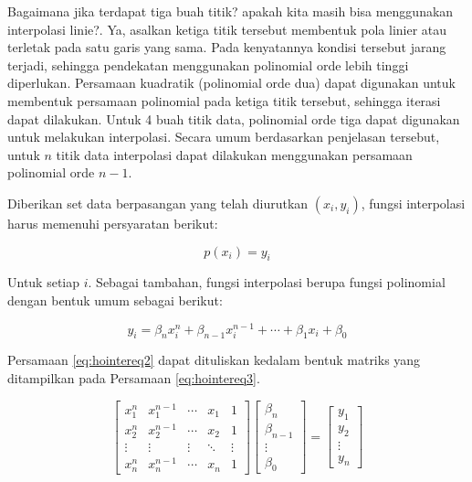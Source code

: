 \documentclass[]{book}
\theoremstyle{definition}
\theoremstyle{definition}
\theoremstyle{definition}
\theoremstyle{remark}
\begin{document}
Bagaimana jika terdapat tiga buah titik? apakah kita masih bisa menggunakan interpolasi linie?. Ya, asalkan ketiga titik tersebut membentuk pola linier atau terletak pada satu garis yang sama. Pada kenyatannya kondisi tersebut jarang terjadi, sehingga pendekatan menggunakan polinomial orde lebih tinggi diperlukan. Persamaan kuadratik (polinomial orde dua) dapat digunakan untuk membentuk persamaan polinomial pada ketiga titik tersebut, sehingga iterasi dapat dilakukan. Untuk 4 buah titik data, polinomial orde tiga dapat digunakan untuk melakukan interpolasi. Secara umum berdasarkan penjelasan tersebut, untuk \(n\) titik data interpolasi dapat dilakukan menggunakan persamaan polinomial orde \(n-1\).

Diberikan set data berpasangan yang telah diurutkan \(\left(x_i,y_i\right)\), fungsi interpolasi harus memenuhi persyaratan berikut:

\begin{equation}
p\left(x_i\right)=y_i
  \label{eq:hointereq}
\end{equation}

Untuk setiap \(i\). Sebagai tambahan, fungsi interpolasi berupa fungsi polinomial dengan bentuk umum sebagai berikut:

\begin{equation}
y_i=\beta_nx_i^n+\beta_{n-1}x_i^{n-1}+\cdots+\beta_1x_i+\beta_0
  \label{eq:hointereq2}
\end{equation}

Persamaan \eqref{eq:hointereq2} dapat dituliskan kedalam bentuk matriks yang ditampilkan pada Persamaan \eqref{eq:hointereq3}.

\begin{equation}
\begin{bmatrix}
     x_1^n   & x_1^{n-1} & \cdots & x_1  & 1            \\[0.3em]
     x_2^n   & x_2^{n-1} & \cdots & x_2  & 1           \\[0.3em]
     \vdots  & \vdots    & \vdots &\ddots& \vdots            \\[0.3em]
     x_n^n   & x_n^{n-1} & \cdots & x_n  & 1
     \end{bmatrix}
\begin{bmatrix}
     \beta_n                                          \\[0.3em]
     \beta_{n-1}                                      \\[0.3em]
     \vdots                                           \\[0.3em]
     \beta_0                                       
     \end{bmatrix}
= \begin{bmatrix}
     y_1                                          \\[0.3em]
     y_2                                          \\[0.3em]
     \vdots                                       \\[0.3em]
     y_n                                       
     \end{bmatrix}
  \label{eq:hointereq3}
\end{equation}
\end{document}
